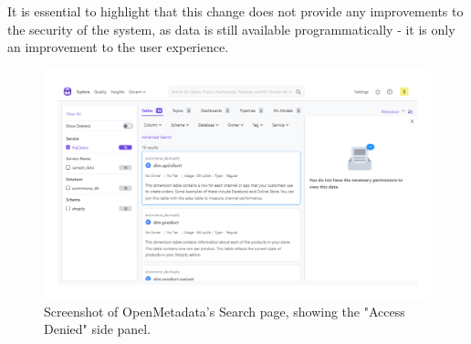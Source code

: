It is essential to highlight that this change does not provide any improvements to the security of the system, as data is still available programmatically - it is only an improvement to the user experience.

\begin{figure}
    \centering
    \includegraphics[width=\textwidth]{chapters/implementation/figures/openmetadata_sample_data_explore_denied.pdf}
    \caption{Screenshot of OpenMetadata's Search page, showing the "Access Denied" side panel.}
    \label{fig:openmetadata_sample_data_explore_denied}
\end{figure}


